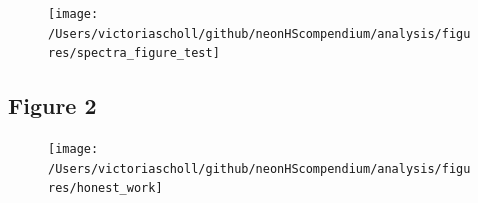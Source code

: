 \documentclass[
]{article}
\begin{document}
\begin{figure}
\texttt{[image: /Users/victoriascholl/github/neonHScompendium/analysis/figures/spectra\_figure\_test]} \end{figure}

\clearpage

\hypertarget{figure-2-1}{%
\subsection*{Figure 2}\label{figure-2-1}}

\begin{figure}
\texttt{[image: /Users/victoriascholl/github/neonHScompendium/analysis/figures/honest\_work]} \end{figure}

\clearpage
\end{document}
